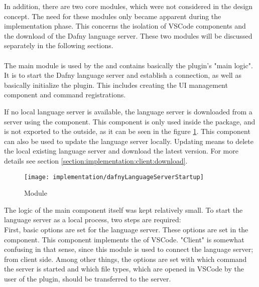 In addition, there are two core modules, which were not considered in the design concept.
The need for these modules only became apparent during the implementation phase.
This concerns the isolation of VSCode components
and the download of the Dafny language server.
These two modules will be discussed separately in the following sections.\\

\textbf{}\\
The main module  is used by the 
and contains basically the plugin's "main logic".
It is to start the Dafny language server and establish a connection,
as well as basically initialize the plugin. This includes creating the UI management component and command registrations.

If no local language server is available, the language server is downloaded from a server using the \linebreak
{} component.
This component is only used inside the package, and is not exported to the outside,
as it can be seen in the figure \ref{fig:dafnyLanguageServerStartup}.
This component can also be used to update the language server locally.
Updating means to delete the local existing language server and download the latest version.
For more details see section \ref{section:implementation:client:download}.

\begin{figure}[H]
    \centering
    \texttt{[image: implementation/dafnyLanguageServerStartup]}
    \caption{Module }
    \label{fig:dafnyLanguageServerStartup}
\end{figure}

The logic of the main component  itself was kept relatively small.
To start the language server as a local process, two steps are required:\\

First, basic options are set for the language server.
These options are set in the  component. This component implements the 
of VSCode. "Client" is somewhat confusing in that sense, since this module is used to connect the language server; from client side.
Among other things, the options are set with which command the server is started and which file types, which are opened in VSCode by the user of the plugin, should be transferred to the server. \\

